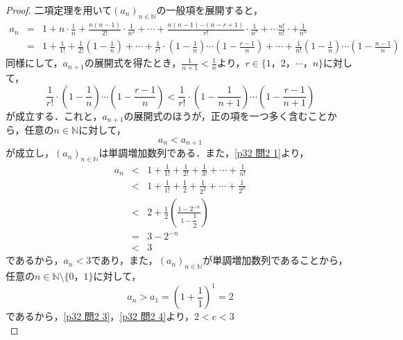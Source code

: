 \documentclass[dvipdfmx,uplatex,11pt]{jsarticle}
\theoremstyle{definition}
\begin{document}
\begin{leftbar}
	\begin{proof}
		二項定理を用いて$(a_n)_{n \in \mathbb{N}}$の一般項を展開すると，
		\begin{eqnarray}
			a_n & = & 1 + n \cdot \frac{1}{n} + \frac{n(n-1)}{2!} \cdot \frac{1}{n^2} + \cdots + \frac{n(n-1)\cdots(n-r+1)}{r!} \cdot \frac{1}{n^r} + \cdots \frac{n!}{n!} \cdot + \frac{1}{n^n} \nonumber  \\
			& = & 1+ \frac{1}{1!} + \frac{1}{2!} \left(1- \frac{1}{n} \right) + \cdots + \frac{1}{r!} \cdot  \left(1 - \frac{1}{n} \right) \cdots \left (1-\frac{r-1}{n} \right) + \cdots \nonumber +  \frac{1}{n!} \left(1 - \frac{1}{n} \right) \cdots \left(1- \frac{n-1}{n} \right) \label{p32 問2 1}
		\end{eqnarray}
		同様にして，$a_{n+1}$の展開式を得たとき，$ \frac{1}{n+1} < \frac{1}{n}$より，$r\in \{ 1，2，\cdots ，n\}$に対して，
		\begin{equation}
			\frac{1}{r!} \cdot  \left(1 - \frac{1}{n} \right) \cdots \left (1-\frac{r-1}{n} \right) < \frac{1}{r!} \cdot  \left(1 - \frac{1}{n+1} \right) \cdots \left (1-\frac{r-1}{n+1} \right)
		\end{equation}
		が成立する．これと，$a_{n+1}$の展開式のほうが，正の項を一つ多く含むことから，任意の$n \in \mathbb{N}$に対して，
		\begin{equation}
			a_{n} < a_{n+1}
		\end{equation}
		が成立し，$(a_n)_{n \in \mathbb{N}}$は単調増加数列である．また，\eqref{p32 問2 1}より，
		\begin{eqnarray}
			\label{p32 問2 2}
			a_n &<& 1 + \frac{1}{1!} + \frac{1}{2!} +\frac{1}{3!} + \cdots + \frac{1}{n!} \\
			& < & 1 + \frac{1}{1!} + \frac{1}{2}+ \frac{1}{2^2} + \cdots + \frac{1}{2^n} \\
			& < & 2 + \frac{1}{2} \left( \frac{ 1 - 2^{-n} }{ 1- \dfrac{1}{2} } \right)\\
			& = & 3-2^{-n} \\
			\label{p32 問2 3}
			& < & 3
		\end{eqnarray}
		であるから，$a_n < 3$であり，また，$(a_n)_{n \in \mathbb{N}}$が単調増加数列であることから，任意の$n \in \mathbb{N} \setminus \{0，1\}$に対して，
		\begin{equation}
			\label{p32 問2 4}
			a_n > a_1 = \left(1+\frac{1}{1}\right)^1 =2
		\end{equation}
		であるから，\eqref{p32 問2 3}，\eqref{p32 問2 4}より，$2<e<3$\\

\end{proof}
\end{leftbar}
\end{document}
